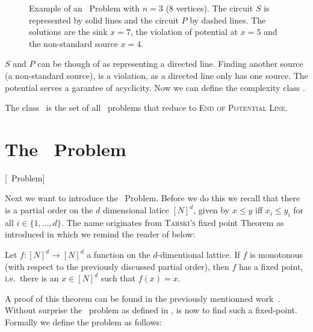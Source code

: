 \begin{figure}[ht]
    \centering
    \caption[Example of an \EOPL\ Problem]{Example of an \EOPL\ Problem with $n=3$ (8 vertices).
        The circuit $S$ is represented by solid lines and the circuit $P$ by dashed lines.
        The solutions are the sink $x=7$, the violation of potential at $x=5$ and the non-standard source $x=4$.}
    \label{fig:eopl_example}
\end{figure}

$S$ and $P$ can be though of as representing a directed line.
Finding another source (a non-standard source), is a violation, as a directed line only has one source.
The potential serves a garantee of acyclicity. Now we can define the complexity class \EOPL.

\begin{definition}[\EOPL]
    The class \EOPL\ is the set of all \TFNP\ problems that reduce to \textsc{End of Potential Line}.
\end{definition}

\section{The \Tarski\ Problem}[\Tarski\ Problem]
\label{sec:tarski_problem}

Next we want to introduce the \Tarski\ Problem.
Before we do this we recall that there is a partial order on the $d$ dimensional latice ${[N]}^d$, given by $x \leq y$ iff $x_i \leq y_i$ for all $i \in \{1,
    \dots, d\}$.
The name originates from \textsc{Tarski's} fixed point Theorem as introduced in  which we remind the reader of below:

\begin{theorem}
    Let $f : {[N]}^d \rightarrow {[N]}^d$ a function on the $d$-dimentional lattice.
    If $f$ is monotonous (with respect to the previously discussed partial order), then $f$ has a fixed point, i.e.\ there is an $x \in {[N]}^d$ such that
    $f(x)=x$.
\end{theorem}

A proof of this theorem can be found in the previously mentionned work~\cite{tarski_lattice-theoretical_1955}.
Without surprise the \Tarski\ problem as defined in , is now to find such a fixed-point.
Formally we define the problem as follows:

